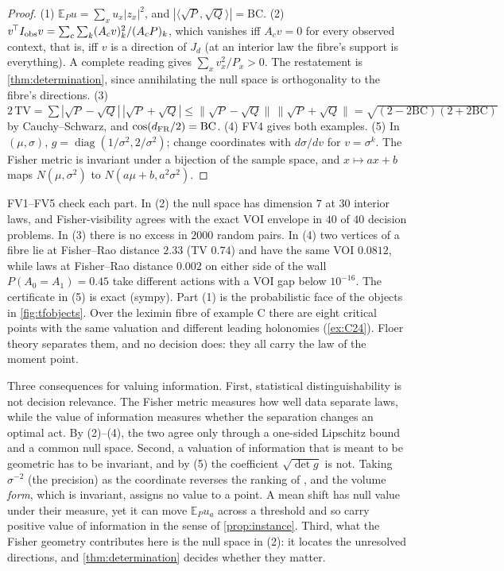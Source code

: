 \documentclass[11pt]{article}
\theoremstyle{definition}\newtheorem{definition}[theorem]{Definition}\newtheorem{remark}[theorem]{Remark}\newtheorem{example}[theorem]{Example}\newtheorem{problem}[theorem]{Open problem}\crefname{problem}{Problem}{Problems}
\begin{document}
\begin{proof}
(1) $\mathbb E_Pu=\sum_xu_x|z_x|^2$, and $|\langle\sqrt P,\sqrt Q\rangle|=\mathrm{BC}$.
(2) $v^{\!\top}I_{\rm obs}v=\sum_c\sum_k(A_cv)_k^2/(A_cP)_k$, which vanishes iff $A_cv=0$ for every observed context, that is, iff $v$ is a direction of $J_d$ (at an interior law the fibre's support is everything). A complete reading gives $\sum_xv_x^2/P_x>0$. The restatement is \cref{thm:determination}, since annihilating the null space is orthogonality to the fibre's directions.
(3) $2\,\mathrm{TV}=\sum|\sqrt P-\sqrt Q|\,|\sqrt P+\sqrt Q|\le\|\sqrt P-\sqrt Q\|\,\|\sqrt P+\sqrt Q\|=\sqrt{(2-2\mathrm{BC})(2+2\mathrm{BC})}$ by Cauchy--Schwarz, and $\cos(d_{\rm FR}/2)=\mathrm{BC}$.
(4) FV4 gives both examples.
(5) In $(\mu,\sigma)$, $g=\operatorname{diag}(1/\sigma^2,2/\sigma^2)$; change coordinates with $d\sigma/dv$ for $v=\sigma^k$. The Fisher metric is invariant under a bijection of the sample space, and $x\mapsto ax+b$ maps $N(\mu,\sigma^2)$ to $N(a\mu+b,a^2\sigma^2)$.
\end{proof}

FV1--FV5 check each part. In (2) the null space has dimension $7$ at $30$ interior laws, and Fisher-visibility agrees with the exact VOI envelope in $40$ of $40$ decision problems. In (3) there is no excess in $2000$ random pairs. In (4) two vertices of a fibre lie at Fisher--Rao distance $2.33$ (TV $0.74$) and have the same VOI $0.0812$, while laws at Fisher--Rao distance $0.002$ on either side of the wall $P(A_0=A_1)=0.45$ take different actions with a VOI gap below $10^{-16}$. The certificate in (5) is exact (sympy). Part (1) is the probabilistic face of the objects in \cref{fig:tfobjects}. Over the leximin fibre of example C there are eight critical points with the same valuation and different leading holonomies (\cref{ex:C24}). Floer theory separates them, and no decision does: they all carry the law of the moment point.

Three consequences for valuing information. First, statistical distinguishability is not decision relevance. The Fisher metric measures how well data separate laws, while the value of information measures whether the separation changes an optimal act. By (2)--(4), the two agree only through a one-sided Lipschitz bound and a common null space. Second, a valuation of information that is meant to be geometric has to be invariant, and by (5) the coefficient $\sqrt{\det g}$ is not. Taking $\sigma^{-2}$ (the precision) as the coordinate reverses the ranking of \cite{MoskowitzRussellLawless2020}, and the volume \emph{form}, which is invariant, assigns no value to a point. A mean shift has null value under their measure, yet it can move $\mathbb E_Pu_a$ across a threshold and so carry positive value of information in the sense of \cref{prop:instance}. Third, what the Fisher geometry contributes here is the null space in (2): it locates the unresolved directions, and \cref{thm:determination} decides whether they matter.
\end{document}
